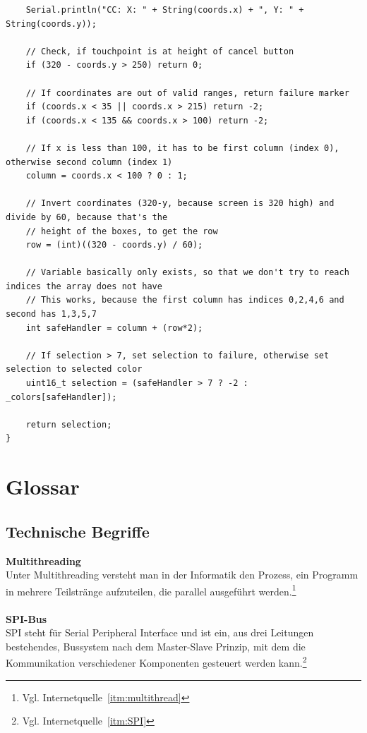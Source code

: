 \documentclass[a4paper, 11pt]{scrartcl}
\begin{document}
\begin{small}
\begin{lstlisting}
    Serial.println("CC: X: " + String(coords.x) + ", Y: " + String(coords.y));

    // Check, if touchpoint is at height of cancel button
    if (320 - coords.y > 250) return 0;

    // If coordinates are out of valid ranges, return failure marker
    if (coords.x < 35 || coords.x > 215) return -2;
    if (coords.x < 135 && coords.x > 100) return -2;

    // If x is less than 100, it has to be first column (index 0), otherwise second column (index 1)
    column = coords.x < 100 ? 0 : 1;

    // Invert coordinates (320-y, because screen is 320 high) and divide by 60, because that's the 
    // height of the boxes, to get the row
    row = (int)((320 - coords.y) / 60);

    // Variable basically only exists, so that we don't try to reach indices the array does not have
    // This works, because the first column has indices 0,2,4,6 and second has 1,3,5,7
    int safeHandler = column + (row*2);

    // If selection > 7, set selection to failure, otherwise set selection to selected color
    uint16_t selection = (safeHandler > 7 ? -2 : _colors[safeHandler]);

    return selection;
}
\end{lstlisting}











\end{small}
\newpage
\section{Glossar}
\subsection{Technische Begriffe}
\textbf{Multithreading\label{def:multithreading}}
\\
Unter Multithreading versteht man in der Informatik den Prozess, ein Programm in mehrere Teilstränge aufzuteilen, die parallel 
ausgeführt werden.\footnote{Vgl. Internetquelle~\ref{itm:multithread}}
\\
\\
\textbf{SPI-Bus\label{def:SPI}}
\\
SPI steht für Serial Peripheral Interface und ist ein, aus drei Leitungen bestehendes, Bussystem nach dem Master-Slave Prinzip, mit dem die Kommunikation
verschiedener Komponenten gesteuert werden kann.\footnote{Vgl. Internetquelle~\ref{itm:SPI}}
\end{document}
